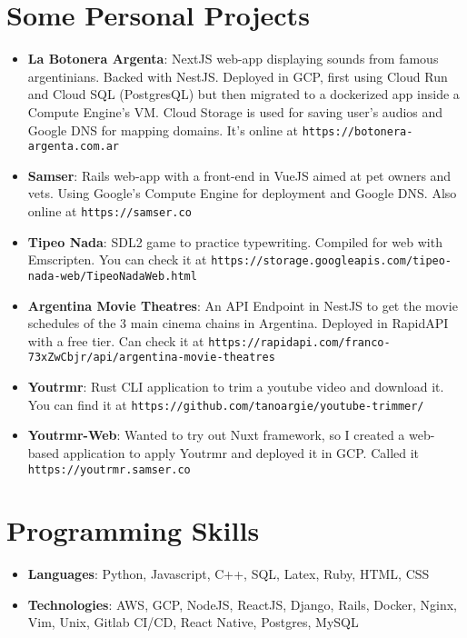 \documentclass[letterpaper,11pt]{article}
\newcommand{\resumeItem}[2]{
  \item\small{
    \textbf{#1}{: #2 \vspace{-2pt}}
  }
}
\newcommand{\resumeSubItem}[2]{\resumeItem{#1}{#2}\vspace{-4pt}}
\newcommand{\resumeSubHeadingListStart}{\begin{itemize}[leftmargin=*]}
\newcommand{\resumeSubHeadingListEnd}{\end{itemize}}
\begin{document}
\section{Some Personal Projects}
 \resumeSubHeadingListStart
   \resumeSubItem{La Botonera Argenta}
     {NextJS web-app displaying sounds from famous argentinians. Backed with NestJS. Deployed in GCP, first using Cloud Run and Cloud SQL (PostgresQL) but then migrated to a dockerized app inside a Compute Engine's VM. Cloud Storage is used for saving user's audios and Google DNS for mapping domains. It's online at \nolinkurl{https://botonera-argenta.com.ar}}
   \resumeSubItem{Samser}
     {Rails web-app with a front-end in VueJS aimed at pet owners and vets. Using Google's Compute Engine for deployment and Google DNS. Also online at \nolinkurl{https://samser.co}}
   \resumeSubItem{Tipeo Nada}
     {SDL2 game to practice typewriting. Compiled for web with Emscripten. You can check it at \nolinkurl{https://storage.googleapis.com/tipeo-nada-web/TipeoNadaWeb.html}}
   \resumeSubItem{Argentina Movie Theatres}
     {An API Endpoint in NestJS to get the movie schedules of the 3 main cinema chains in Argentina. Deployed in RapidAPI with a free tier. Can check it at \nolinkurl{https://rapidapi.com/franco-73xZwCbjr/api/argentina-movie-theatres}}
   \resumeSubItem{Youtrmr}
     {Rust CLI application to trim a youtube video and download it. You can find it at \nolinkurl{https://github.com/tanoargie/youtube-trimmer/}}
   \resumeSubItem{Youtrmr-Web}
     {Wanted to try out Nuxt framework, so I created a web-based application to apply Youtrmr and deployed it in GCP. Called it \nolinkurl{https://youtrmr.samser.co}}
 \resumeSubHeadingListEnd


\section{Programming Skills}
  \resumeSubHeadingListStart
    \item{
      \textbf{Languages}{: Python, Javascript, C++, SQL, Latex, Ruby, HTML, CSS}
    }
    \item{
      \textbf{Technologies}{: AWS, GCP, NodeJS, ReactJS, Django, Rails, Docker, Nginx, Vim, Unix, Gitlab CI/CD, React Native, Postgres, MySQL}
    }
  \resumeSubHeadingListEnd


\end{document}
